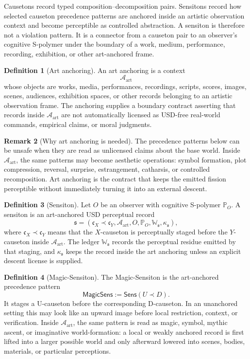 \documentclass[11pt]{article}
\newcommand{\defeq}{\mathrel{:=}}
\newcommand{\Sens}{\mathsf{Sens}}
\newcommand{\Art}{\mathcal A_{\mathrm{art}}}
\newcommand{\MagicSens}{\mathsf{MagicSens}}
\theoremstyle{definition}
\newtheorem{definition}{Definition}[section]
\newtheorem{remark}[definition]{Remark}
\theoremstyle{plain}
\begin{document}
Causetons record typed composition--decomposition pairs.  Sensitons record
how selected causeton precedence patterns are anchored inside an artistic
observation context and become perceptible as controlled abstraction.  A
sensiton is therefore not a violation pattern.  It is a connector from a
causeton pair to an observer's cognitive S-polymer under the boundary of a
work, medium, performance, recording, exhibition, or other art-anchored
frame.

\begin{definition}[Art anchoring]
An art anchoring is a context
\[
  \Art
\]
whose objects are works, media, performances, recordings, scripts, scores,
images, scenes, audiences, exhibition spaces, or other records belonging
to an artistic observation frame.  The anchoring supplies a boundary
contract asserting that records inside \(\Art\) are not automatically
licensed as USD-free real-world commands, empirical claims, or moral
judgments.
\end{definition}

\begin{remark}[Why art anchoring is needed]
The precedence patterns below can be unsafe when they are read as
unlicensed claims about the base world.  Inside \(\Art\), the same
patterns may become aesthetic operations: symbol formation, plot
compression, reversal, surprise, estrangement, catharsis, or controlled
recomposition.  Art anchoring is the contract that keeps the emitted
fission perceptible without immediately turning it into an external
descent.
\end{remark}

\begin{definition}[Sensiton]
Let \(O\) be an observer with cognitive S-polymer \(\mathbb P_O\).  A
sensiton is an art-anchored USD perceptual record
\[
  \mathfrak s
  =
  (\mathfrak c_X\prec\mathfrak c_Y,
   \Art,
   O,
   \mathbb P_O,
   \mathbb W_{\mathfrak s},
   \kappa_{\mathfrak s}),
\]
where \(\mathfrak c_X\prec\mathfrak c_Y\) means that the \(X\)-causeton
is perceptually staged before the \(Y\)-causeton inside \(\Art\).  The
ledger \(\mathbb W_{\mathfrak s}\) records the perceptual residue emitted
by that staging, and \(\kappa_{\mathfrak s}\) keeps the record inside the
art anchoring unless an explicit descent license is supplied.
\end{definition}

\begin{definition}[Magic-Sensiton]
The Magic-Sensiton is the art-anchored precedence pattern
\[
  \MagicSens
  \defeq
  \Sens(U\prec D).
\]
It stages a U-causeton before the corresponding D-causeton.  In an
unanchored setting this may look like an upward image before local
restriction, context, or verification.  Inside \(\Art\), the same pattern
is read as magic, symbol, mythic ascent, or imaginative world-formation:
a local or weakly anchored record is first lifted into a larger possible
world and only afterward lowered into scenes, bodies, materials, or
particular perceptions.
\end{definition}
\end{document}
